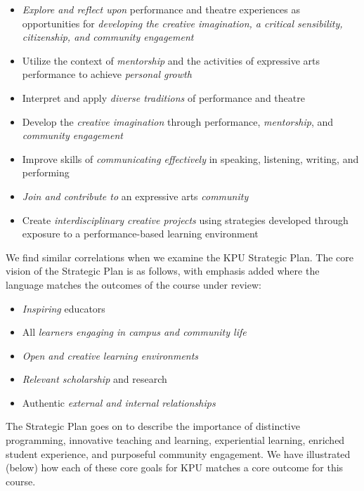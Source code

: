 \documentclass[letterpaper,10pt,headsepline]{scrreprt}
\begin{document}
\begin{itemize}
\item
  \emph{Explore and reflect upon} performance and theatre experiences as
  opportunities for \emph{developing the creative imagination, a
  critical sensibility, citizenship, and community engagement}
\item
  Utilize the context of \emph{mentorship} and the activities of
  expressive arts performance to achieve \emph{personal growth}
\item
  Interpret and apply \emph{diverse traditions} of performance and
  theatre
\item
  Develop the \emph{creative imagination} through performance,
  \emph{mentorship}, and \emph{community engagement}
\item
  Improve skills of \emph{communicating effectively} in speaking,
  listening, writing, and performing
\item
  \emph{Join and contribute to} an expressive arts \emph{community}
\item
  Create \emph{interdisciplinary creative projects} using strategies
  developed through exposure to a performance-based learning environment
\end{itemize}

We find similar correlations when we examine the KPU Strategic Plan. The
core vision of the Strategic Plan is as follows, with emphasis added
where the language matches the outcomes of the course under review:

\begin{itemize}
\item
  \emph{Inspiring} educators
\item
  All \emph{learners engaging in campus and community life}
\item
  \emph{Open and creative learning environments}
\item
  \emph{Relevant scholarship} and research
\item
  Authentic \emph{external and internal relationships}
\end{itemize}

The Strategic Plan goes on to describe the importance of distinctive
programming, innovative teaching and learning, experiential learning,
enriched student experience, and purposeful community engagement. We
have illustrated (below) how each of these core goals for KPU matches a
core outcome for this course.
\end{document}
